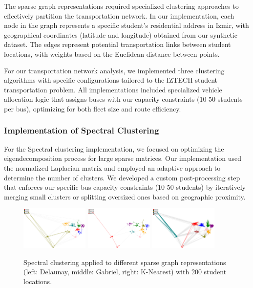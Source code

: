 The sparse graph representations required specialized clustering approaches to effectively partition the transportation network. In our implementation, each node in the graph represents a specific student's residential address in Izmir, with geographical coordinates (latitude and longitude) obtained from our synthetic dataset. The edges represent potential transportation links between student locations, with weights based on the Euclidean distance between points.

For our transportation network analysis, we implemented three clustering algorithms with specific configurations tailored to the IZTECH student transportation problem. All implementations included specialized vehicle allocation logic that assigns buses with our capacity constraints (10-50 students per bus), optimizing for both fleet size and route efficiency.

\subsubsection{Implementation of Spectral Clustering}
\label{subsubsec:spectral_implementation}

For the Spectral clustering implementation, we focused on optimizing the eigendecomposition process for large sparse matrices. Our implementation used the normalized Laplacian matrix and employed an adaptive approach to determine the number of clusters. We developed a custom post-processing step that enforces our specific bus capacity constraints (10-50 students) by iteratively merging small clusters or splitting oversized ones based on geographic proximity.

\begin{figure}[htbp]
\centering
\includegraphics[width=0.3\textwidth]{./img/Spectral_Delaunay}
\hspace{0.2cm}
\includegraphics[width=0.3\textwidth]{./img/Spectral_Gabriel}
\hspace{0.2cm}
\includegraphics[width=0.3\textwidth]{./img/Spectral_K}

\caption{Spectral clustering applied to different sparse graph representations (left: Delaunay, middle: Gabriel, right: K-Nearest) with 200 student locations.}
\label{fig:spectral_clustering}
\end{figure}

